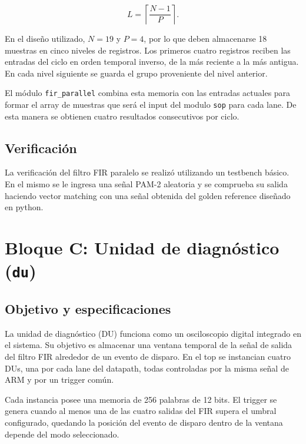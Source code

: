 \documentclass[10pt,a4paper]{article}
\begin{document}
\begin{equation}
    L=\left\lceil\frac{N-1}{P}\right\rceil.
    \label{eq:fir-niveles-regresor}
\end{equation}

En el diseño utilizado, $N=19$ y $P=4$, por lo que deben almacenarse 18 muestras en
cinco niveles de registros. Los primeros cuatro registros reciben las entradas del
ciclo en orden temporal inverso, de la más reciente a la más antigua. En cada nivel
siguiente se guarda el grupo proveniente del nivel anterior.

El módulo \texttt{fir\_parallel} combina esta memoria con las entradas actuales para
formar el array de muestras que será el input del modulo \texttt{sop} para cada lane.
De esta manera se obtienen cuatro resultados consecutivos por ciclo.

\subsection{Verificación}

La verificación del filtro FIR paralelo se realizó utilizando un testbench básico.
En el mismo se le ingresa una señal PAM-2 aleatoria y se comprueba su salida haciendo 
vector matching con una señal obtenida del golden reference diseñado en python.

\clearpage

\section{Bloque C: Unidad de diagnóstico (\texttt{du})}
\label{sec:du}

\subsection{Objetivo y especificaciones}

La unidad de diagnóstico (DU) funciona como un osciloscopio digital integrado en el
sistema. Su objetivo es almacenar una ventana temporal de la señal de salida del
filtro FIR alrededor de un evento de disparo. En el top se instancian cuatro DUs, 
una por cada lane del datapath, todas controladas por la misma señal de ARM y por 
un trigger común.

Cada instancia posee una memoria de 256 palabras de 12 bits. El trigger se genera
cuando al menos una de las cuatro salidas del FIR supera el umbral configurado, 
quedando la posición del evento de disparo dentro de la ventana depende del modo 
seleccionado.
\end{document}
